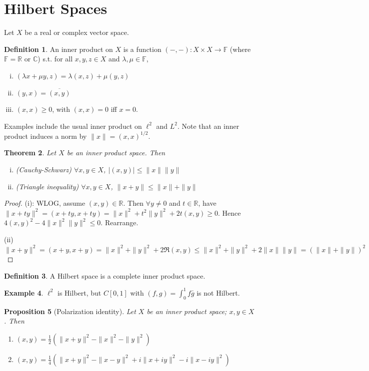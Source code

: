 \documentclass{article}
\theoremstyle{definition}
\newtheorem{defn}{Definition}[section]
\newtheorem{example}[defn]{Example}
\theoremstyle{remark}
\theoremstyle{plain}
\newtheorem{thm}[defn]{Theorem}
\newtheorem{prop}[defn]{Proposition}
\newcommand{\RR}{\mathbb{R}}
\newcommand{\CC}{\mathbb{C}}
\newcommand{\FF}{\mathbb{F}}
\begin{document}
\section{Hilbert Spaces}
Let $X$ be a real or complex vector space.
\begin{defn}
    An inner product on $X$ is a function $(-,-):X\times X\to \FF$ (where $\FF=\RR$ or $\CC$) s.t. for all $x,y,z\in X$ and $\lambda,\mu\in\FF$,
    \begin{enumerate}[(i)]
        \item $(\lambda x+\mu y,z)=\lambda(x,z)+\mu(y,z)$
        \item $(y,x)=\overline{(x,y)}$
        \item $(x,x)\ge 0$, with $(x,x)=0$ iff $x=0$.
    \end{enumerate}
\end{defn}
Examples include the usual inner product on $\ell^2$ and $L^2$. Note that an inner product induces a norm by $\|x\|=(x,x)^{1/2}$.
\begin{thm}
    Let $X$ be an inner product space. Then
    \begin{enumerate}[(i)]
        \item (Cauchy-Schwarz) $\forall x,y\in X$, $|(x,y)|\le \|x\|\|y\|$
        \item (Triangle inequality) $\forall x,y\in X$, $\|x+y\|\le \|x\|+\|y\|$
    \end{enumerate}
\end{thm}
\begin{proof}
    (i): WLOG, assume $(x,y)\in \RR$. Then $\forall y\neq 0$ and $t\in\RR$, have $\|x+ty\|^2=(x+ty,x+ty)=\|x\|^2+t^2\|y\|^2+2t(x,y)\ge 0$. Hence $4(x,y)^2-4\|x\|^2\|y\|^2\le 0$. Rearrange.

    (ii) $\|x+y\|^2=(x+y,x+y)=\|x\|^2+\|y\|^2+2\Re(x,y)\le \|x\|^2+\|y\|^2+2\|x\|\|y\|=(\|x\|+\|y\|)^2$
\end{proof}
\begin{defn}
    A Hilbert space is a complete inner product space.
\end{defn}
\begin{example}
    $\ell^2$ is Hilbert, but $C[0,1]$ with $(f,g)=\int_0^1 f\bar g$ is not Hilbert.
\end{example}
\begin{prop}[Polarization identity]
    Let $X$ be an inner product space; $x,y\in X$. Then
    \begin{enumerate}
        \item[Real Case:] $(x,y)=\frac12(\|x+y\|^2-\|x\|^2-\|y\|^2)$
        \item[Complex Case:] $(x,y)=\frac14(\|x+y\|^2-\|x-y\|^2+i\|x+iy\|^2-i\|x-iy\|^2)$
    \end{enumerate}
\end{prop}
\end{document}
